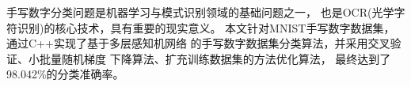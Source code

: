 





\baselineskip=23pt  %





\begin{cnabstract}
  手写数字分类问题是机器学习与模式识别领域的基础问题之一，
  也是OCR(光学字符识别)的核心技术，具有重要的现实意义。
  本文针对MNIST手写数字数据集，通过C++实现了基于多层感知机网络
  的手写数字数据集分类算法，并采用交叉验证、小批量随机梯度
  下降算法、扩充训练数据集的方法优化算法，
  最终达到了98.042\%的分类准确率。


\end{cnabstract}
\par
\vspace*{2em}




